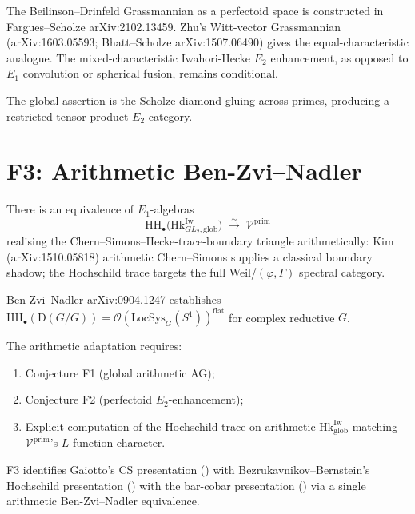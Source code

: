 \begin{remark}[form]
The Beilinson--Drinfeld Grassmannian as
a perfectoid space is constructed in Fargues--Scholze
arXiv:2102.13459. Zhu's Witt-vector Grassmannian
(arXiv:1603.05593; Bhatt--Scholze arXiv:1507.06490) gives the
equal-characteristic analogue. The mixed-characteristic
Iwahori-Hecke \(E_{2}\) enhancement, as opposed to \(E_{1}\) convolution
or spherical fusion, remains conditional.

The global assertion is the Scholze-diamond gluing across primes,
producing a restricted-tensor-product \(E_{2}\)-category.
\end{remark}

\section{F3: Arithmetic Ben-Zvi--Nadler}
\label{v4-arith:of:F3}

\begin{conjecture}
\label{v4-arith:conj:F3-arith-BZN}
There is an equivalence of \(E_{1}\)-algebras
\begin{equation}
\mathrm{HH}_{\bullet}\bigl(\mathrm{Hk}^{\mathrm{Iw}}_{GL_{2},\mathrm{glob}}\bigr)\;\xrightarrow{\sim}\;\mathcal{V}^{\mathrm{prim}}
\end{equation}
realising the Chern--Simons--Hecke-trace-boundary triangle arithmetically:
Kim (arXiv:1510.05818) arithmetic Chern--Simons supplies a classical
boundary shadow; the Hochschild trace targets the full
Weil/\((\varphi,\Gamma)\) spectral category.
\end{conjecture}

\begin{remark}[form]
Ben-Zvi--Nadler
arXiv:0904.1247 establishes
\(\mathrm{HH}_{\bullet}(\mathrm{D}(G/G))=\mathcal{O}(\mathrm{LocSys}_{G}(S^{1}))^{\mathrm{flat}}\)
for complex reductive \(G\).

The arithmetic adaptation requires:
\begin{enumerate}
\item Conjecture F1 (global arithmetic AG);
\item Conjecture F2 (perfectoid \(E_{2}\)-enhancement);
\item Explicit computation of the Hochschild trace on arithmetic
\(\mathrm{Hk}^{\mathrm{Iw}}_{\mathrm{glob}}\) matching \(\mathcal{V}^{\mathrm{prim}}\)'s
\(L\)-function character.
\end{enumerate}

F3 identifies Gaiotto's CS presentation
() with
Bezrukavnikov--Bernstein's Hochschild presentation
() with the bar-cobar
presentation () via a single
arithmetic Ben-Zvi--Nadler equivalence.
\end{remark}


